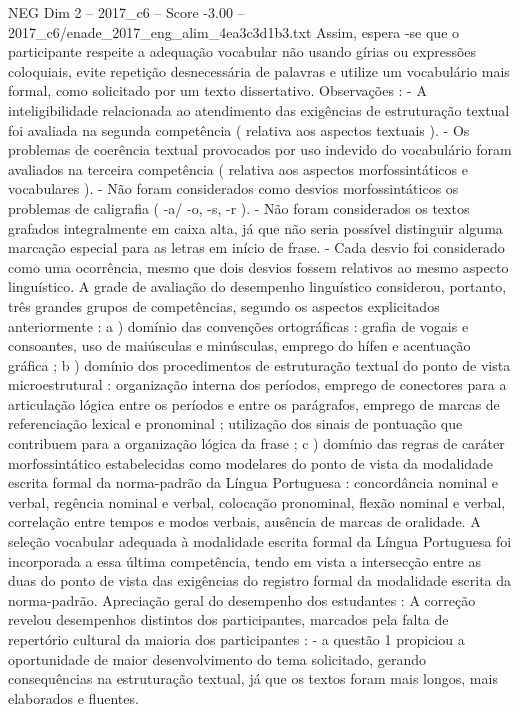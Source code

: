 \begin{textsample}{NEG Dim 2 – 2017\_c6 – Score -3.00 – 2017\_c6/enade\_2017\_eng\_alim\_4ea3c3d1b3.txt}
Assim, espera -se que o participante respeite a adequação vocabular não usando gírias ou expressões coloquiais, evite repetição desnecessária de palavras e utilize um vocabulário mais formal, como solicitado por um texto dissertativo.
Observações : - A inteligibilidade relacionada ao atendimento das exigências de estruturação textual foi avaliada na segunda competência ( relativa aos aspectos textuais ). - Os problemas de coerência textual provocados por uso indevido do vocabulário foram avaliados na terceira competência ( relativa aos aspectos morfossintáticos e vocabulares ). - Não foram considerados como desvios morfossintáticos os problemas de caligrafia ( -a/ -o, -s, -r ). - Não foram considerados os textos grafados integralmente em caixa alta, já que não seria possível distinguir alguma marcação especial para as letras em início de frase. - Cada desvio foi considerado como uma ocorrência, mesmo que dois desvios fossem relativos ao mesmo aspecto linguístico.
A grade de avaliação do desempenho linguístico considerou, portanto, três grandes grupos de competências, segundo os aspectos explicitados anteriormente : a ) domínio das convenções ortográficas : grafia de vogais e consoantes, uso de maiúsculas e minúsculas, emprego do hífen e acentuação gráfica ; b ) domínio dos procedimentos de estruturação textual do ponto de vista microestrutural : organização interna dos períodos, emprego de conectores para a articulação lógica entre os períodos e entre os parágrafos, emprego de marcas de referenciação lexical e pronominal ; utilização dos sinais de pontuação que contribuem para a organização lógica da frase ; c ) domínio das regras de caráter morfossintático estabelecidas como modelares do ponto de vista da modalidade escrita formal da norma-padrão da Língua Portuguesa : concordância nominal e verbal, regência nominal e verbal, colocação pronominal, flexão nominal e verbal, correlação entre tempos e modos verbais, ausência de marcas de oralidade.
A seleção vocabular adequada à modalidade escrita formal da Língua Portuguesa foi incorporada a essa última competência, tendo em vista a intersecção entre as duas do ponto de vista das exigências do registro formal da modalidade escrita da norma-padrão.
Apreciação geral do desempenho dos estudantes : A correção revelou desempenhos distintos dos participantes, marcados pela falta de repertório cultural da maioria dos participantes : - a questão 1 propiciou a oportunidade de maior desenvolvimento do tema solicitado, gerando consequências na estruturação textual, já que os textos foram mais longos, mais elaborados e fluentes.

\end{textsample}
